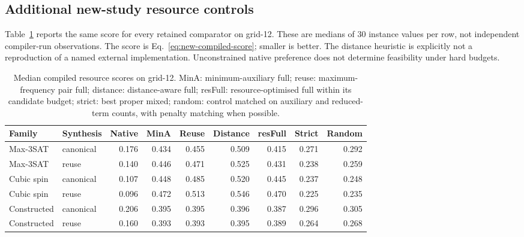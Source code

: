 \subsection{Additional new-study resource controls}

\label{app:new-resource-controls}

Table~\ref{tab:new-resource-baselines} reports the same score for every retained comparator on grid-12. These are medians of 30 instance values per row, not independent compiler-run observations. The score is Eq.~\eqref{eq:new-compiled-score}; smaller is better. The distance heuristic is explicitly not a reproduction of a named external implementation. Unconstrained native preference does not determine feasibility under hard budgets.

\begin{table}[htbp]\centering\footnotesize

\caption{Median compiled resource scores on grid-12. MinA: minimum-auxiliary full; reuse: maximum-frequency pair full; distance: distance-aware full; resFull: resource-optimised full within its candidate budget; strict: best proper mixed; random: control matched on auxiliary and reduced-term counts, with penalty matching when possible.}

\label{tab:new-resource-baselines}

\begin{tabular}{llrrrrrrr}\toprule

Family & Synthesis & Native & MinA & Reuse & Distance & resFull & Strict & Random\\\midrule

Max-3SAT & canonical & 0.176 & 0.434 & 0.455 & 0.509 & 0.415 & 0.271 & 0.292\\

Max-3SAT & reuse & 0.140 & 0.446 & 0.471 & 0.525 & 0.431 & 0.238 & 0.259\\

Cubic spin & canonical & 0.107 & 0.448 & 0.485 & 0.520 & 0.445 & 0.237 & 0.248\\

Cubic spin & reuse & 0.096 & 0.472 & 0.513 & 0.546 & 0.470 & 0.225 & 0.235\\

Constructed & canonical & 0.206 & 0.395 & 0.395 & 0.396 & 0.387 & 0.296 & 0.305\\

Constructed & reuse & 0.160 & 0.393 & 0.393 & 0.395 & 0.389 & 0.264 & 0.268\\

\bottomrule\end{tabular}\end{table}

